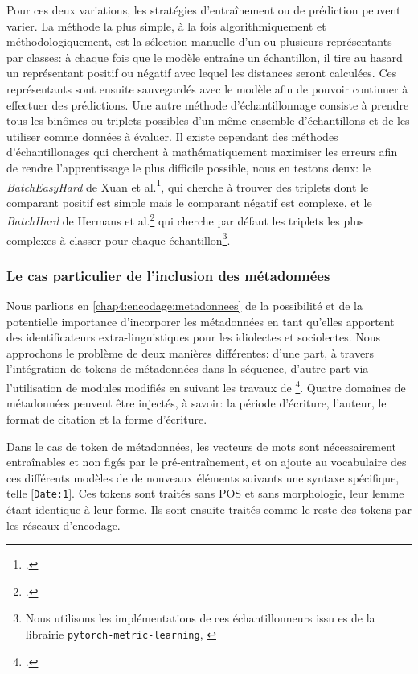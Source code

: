 Pour ces deux variations, les stratégies d'entraînement ou de prédiction peuvent varier. La méthode la plus simple, à la fois algorithmiquement et méthodologiquement, est la sélection manuelle d'un ou plusieurs représentants par classes: à chaque fois que le modèle entraîne un échantillon, il tire au hasard un représentant positif ou négatif avec lequel les distances seront calculées. Ces représentants sont ensuite sauvegardés avec le modèle afin de pouvoir continuer à effectuer des prédictions. Une autre méthode d'échantillonnage consiste à prendre tous les binômes ou triplets possibles d'un même ensemble d'échantillons et de les utiliser comme données à évaluer. Il existe cependant des méthodes d'échantillonages qui cherchent à mathématiquement maximiser les erreurs afin de rendre l'apprentissage le plus difficile possible, nous en testons deux: le \textit{BatchEasyHard} de Xuan et al.\footcite{xuan_improved_2020}, qui cherche à trouver des triplets dont le comparant positif est simple mais le comparant négatif est complexe, et le \textit{BatchHard} de Hermans et al.\footcite{hermans_defense_2017} qui cherche par défaut les triplets les plus complexes à classer pour chaque échantillon\footnote{Nous utilisons les implémentations de ces échantillonneurs issu es de la librairie \texttt{pytorch-metric-learning}, \cite{musgrave2020pytorch}}. 
\subsubsection{Le cas particulier de l'inclusion des métadonnées}

Nous parlions en \ref{chap4:encodage:metadonnees} de la possibilité et de la potentielle importance d'incorporer les métadonnées en tant qu'elles apportent des identificateurs extra-linguistiques pour les idiolectes et sociolectes. Nous approchons le problème de deux manières différentes: d'une part, à travers l'intégration de tokens de métadonnées dans la séquence, d'autre part via l'utilisation de modules modifiés en suivant les travaux de \footcite{kim_categorical_2019}. Quatre domaines de métadonnées peuvent être injectés, à savoir: la période d'écriture, l'auteur, le format de citation et la forme d'écriture.

Dans le cas de token de métadonnées, les vecteurs de mots sont nécessairement entraînables et non figés par le pré-entraînement, et on ajoute au vocabulaire des ces différents modèles de de nouveaux éléments suivants une syntaxe spécifique, telle \texttt{$[$Date:1$]$}. Ces tokens sont traités sans POS et sans morphologie, leur lemme étant identique à leur forme. Ils sont ensuite traités comme le reste des tokens par les réseaux d'encodage.

